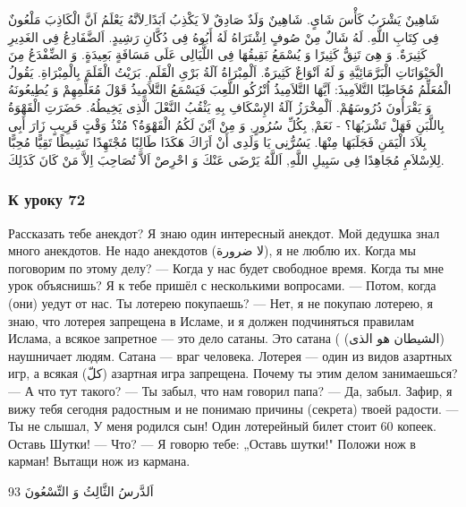 \documentclass[a5paper]{article}
\begin{document}
شَاهِينٌ يَشْرَبُ كَأْسَ شَاىٍ. شَاهِينٌ وَلَدٌ صَادِقٌ لاَ يَكْذِبُ اَبَدًا ِلاَنَّهُ يَعْلَمُ اَنَّ الْكَاذِبَ مَلْعُونٌ فِى كِتَابِ اللَّهِ. لَهُ شَالٌ مِنْ صُوفٍ اِشْتَرَاهُ لَهُ أَبُوهُ فِى دُكَّانِ رَشِيدٍ. اَلضَّفَادِعُ فِى الغَدِيرِ كَثِيرَةٌ. وَ هِىَ تَنِقُّ كَثِيرًا وَ يُسْمَعُ نَقِيقُهَا فِى اللَّيَالِى عَلَى مَسَافَةٍ بَعِيدَةٍ. وَ الضِّفْدَعُ مِنَ الْحَيْوَانَاتِ الْبَرَّمَائِيَّةِ وَ لَهُ اَنْوَاعٌ كَثِيرَةٌ. اَلْمِبْرَاةُ آلَةُ بَرْىِ الْقَلَمِ. بَرَيْتُ الْقَلَمَ بِالْمِبْرَاةِ. يَقُولُ الْمُعَلِّمُ مُخَاطِبًا التَّلاَمِيذَ: اَيَّهَا التَّلاَمِيذُ اُتْرُكُو اللَّعِبَ فَيَسْمَعُ التَّلاَمِيذُ قَوْلَ مُعَلِّمِهِمْ وَ يُطِيعُونَهُ وَ يَقْرَأُونَ دُرُوسَهُمْ. اَلْمِخْرَزُ آلَةُ الإِسْكَافِ بِهِ يَثْقُبُ النَّعْلَ الَّذِى يَخِيطُهُ. حَضَرَتِ الْقَهْوَةُ بِاللَّبَنِ فَهَلْ تَشْرَبُهَا؟ - نَعَمْ, بِكُلِّ سُرُورٍ, وَ مِنْ اَيْنَ لَكُمُ الْقَهْوَةُ؟ مُنْذُ وَقْتٍ قَرِيبٍ زَارَ أَبِى بِلاَدَ الْيَمَنِ فَجَلَبَهَا مِنْهَا. يَسُرُّنِى يَا وَلَدِى أَنْ اَرَاكَ هَكَذَا طَالِبًا مُجْتَهِدًا نَشِيطًا تَقِيًّا مُحِبًّا لِلاِسْلاَمِ مُجَاهِدًا فِى سَبِيلِ اللَّهِ, اَللَّهُ يَرْضَى عَنْكَ وَ احْرِصْ اَلاَّ تُصَاحِبَ اِلاَّ مَنْ كَانَ كَذَلِكَ.

\subsubsection{К уроку 72}
Рассказать тебе анекдот? Я знаю один интересный анекдот. Мой дедушка знал много анекдотов. Не надо анекдотов (لا ضرورة), я не люблю их. Когда мы поговорим по этому делу? — Когда у нас будет свободное время. Когда ты мне урок объяснишь? Я к тебе пришёл с несколькими вопросами. — Потом, когда (они) уедут от нас. Ты лотерею покупаешь? — Нет, я не покупаю лотерею, я знаю, что лотерея запрещена в Исламе, и я должен подчиняться правилам Ислама, а всякое запретное — это дело сатаны. Это сатана ( (الشيطان هو الذى) наушничает людям. Сатана — враг человека. Лотерея — один из видов азартных игр, а всякая (كلّ) азартная игра запрещена. Почему ты этим делом занимаешься? — А что тут такого? — Ты забыл, что нам говорил папа? — Да, забыл. Зафир, я вижу тебя сегодня радостным и не понимаю причины (секрета) твоей радости. — Ты не слышал, У меня родился сын! Один лотерейный билет стоит 60 копеек. Оставь Шутки! — Что? — Я говорю тебе: „Оставь шутки!" Положи нож в карман! Вытащи нож из кармана.

اَلدَّرسُ الثَّالِثُ وَ التِّسْعُونَ 93
\end{document}
